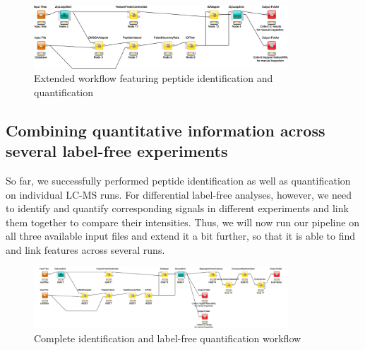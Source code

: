 \begin{figure}[htbp]
  \centering
  \includegraphics[width=0.85\textwidth]{graphics/labelfree/lfq_no_align}
  \caption{Extended workflow featuring peptide identification and quantification}
  \label{fig:ff_idmapping}
\end{figure}

\subsection{Combining quantitative information across several label-free experiments}
\label{Combining}

So far, we successfully performed peptide identification as well as quantification on individual LC-MS runs. For differential label-free analyses, however, we need to identify and quantify corresponding signals in different experiments and link them together to compare their intensities. Thus, we will now run our pipeline on all three available input files and extend it a bit further, so that it is able to find and link features across several runs.

\begin{figure}[htbp]
  \centering
  \includegraphics[width=0.85\textwidth]{graphics/labelfree/lfq}
  \caption{Complete identification and label-free quantification workflow}
  \label{fig:complete_without_consensusid}
\end{figure}

